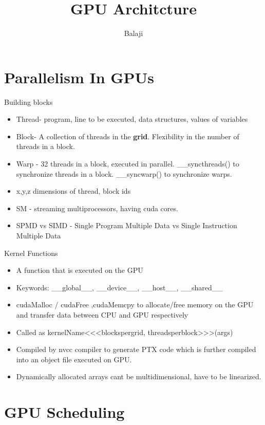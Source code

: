 \documentclass{beamer}
\title{GPU Architcture}
\author{Balaji}
\date{}
\institute{IISc Bangalore}
\begin{document}
\maketitle
\section{Parallelism In GPUs}
\begin{frame}{Building blocks}
    \begin{itemize}
        \item Thread- program, line to be executed, data structures, values of variables
        \item Block- A collection of threads in the \textbf{grid}. Flexibility in the number of threads in a block. 
        \item Warp - 32 threads in a block, executed in parallel. \_\_syncthreads() to synchronize threads in a block. \_\_syncwarp() to synchronize warps.
        \item x,y,z dimensions of thread, block ids
        \item SM - streaming multiprocessors, having cuda cores.
        \item SPMD vs SIMD - Single Program Multiple Data vs Single Instruction Multiple Data
    \end{itemize}
    
\end{frame}
\begin{frame}{Kernel Functions}
    \begin{itemize}
        \item A function that is executed on the GPU
        \item Keywords: \_\_global\_\_, \_\_device\_\_, \_\_host\_\_, \_\_shared\_\_
        \item cudaMalloc / cudaFree ,cudaMemcpy to allocate/free memory on the GPU and transfer data between CPU and GPU respectively
        \item Called as kernelName<<<blockspergrid, threadsperblock>>>(args)
        \item Compiled by nvcc compiler to generate PTX code which is further compiled into an object file executed on GPU.
        \item Dynamically allocated arrays cant be multidimensional, have to be linearized.
    \end{itemize}
\end{frame}
\section{GPU Scheduling}
\end{document}
